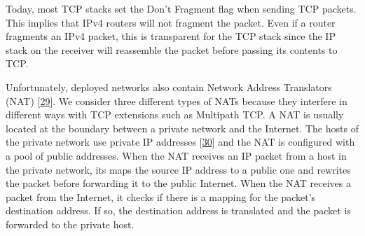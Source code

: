 \documentclass[letterpaper,10pt,english]{sphinxmanual}
\begin{document}
\sphinxAtStartPar
Today, most TCP stacks set the Don’t Fragment flag when sending TCP packets. This implies that IPv4 routers will not fragment the packet. Even if a router fragments an IPv4 packet, this is transparent for the TCP stack since the IP stack on the receiver will reassemble the packet before passing its contents to TCP.

\sphinxAtStartPar
Unfortunately, deployed networks also contain Network Address Translators (NAT) {[}\hyperlink{cite.biblio:id2952}{29}{]}. We consider three different types of NATs because they interfere in different ways with TCP extensions such as Multipath TCP. A NAT is usually located at the boundary between a private network and the Internet. The hosts of the private network use private IP addresses {[}\hyperlink{cite.biblio:id1848}{30}{]} and the NAT is configured with a pool of public addresses. When the NAT receives an IP packet from a host in the private network, its maps the source IP address to a public one and rewrites the packet before forwarding it to the public Internet. When the NAT receives a packet from the Internet, it checks if there is a mapping for the packet’s destination address. If so, the destination address is translated and the packet is forwarded to the private host.
\end{document}
